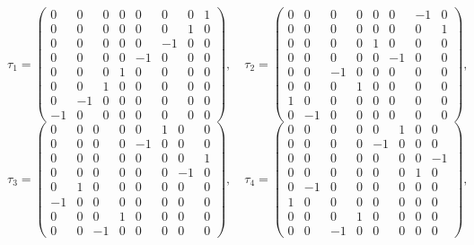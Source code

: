 \documentclass[10pt,a4paper]{article}
\begin{document}
\begin{equation*}
\tau_1=\begin{pmatrix}0 & 0 & 0 & 0 & 0 & 0 & 0 & 1 \\ 0 & 0 & 0 & 0 & 0 & 0 & 1 & 0 \\ 0 & 0 & 0 & 0 & 0 & -1 & 0 & 0 \\ 0 & 0 & 0 & 0 & -1 & 0 & 0 & 0 \\ 0 & 0 & 0 & 1 & 0 & 0 & 0 & 0 \\ 0 & 0 & 1 & 0 & 0 & 0 & 0 & 0 \\ 0 & -1 & 0 & 0 & 0 & 0 & 0 & 0 \\ -1 & 0 & 0 & 0 & 0 & 0 & 0 & 0\end{pmatrix},\quad \tau_2=\begin{pmatrix}0 & 0 & 0 & 0 & 0 & 0 & -1 & 0 \\ 0 & 0 & 0 & 0 & 0 & 0 & 0 & 1 \\ 0 & 0 & 0 & 0 & 1 & 0 & 0 & 0 \\ 0 & 0 & 0 & 0 & 0 & -1 & 0 & 0 \\ 0 & 0 & -1 & 0 & 0 & 0 & 0 & 0 \\ 0 & 0 & 0 & 1 & 0 & 0 & 0 & 0 \\ 1 & 0 & 0 & 0 & 0 & 0 & 0 & 0 \\ 0 & -1 & 0 & 0 & 0 & 0 & 0 & 0\end{pmatrix},
\end{equation*}
\begin{equation*}
\tau_3=\begin{pmatrix}0 & 0 & 0 & 0 & 0 & 1 & 0 & 0 \\ 0 & 0 & 0 & 0 & -1 & 0 & 0 & 0 \\ 0 & 0 & 0 & 0 & 0 & 0 & 0 & 1 \\ 0 & 0 & 0 & 0 & 0 & 0 & -1 & 0 \\ 0 & 1 & 0 & 0 & 0 & 0 & 0 & 0 \\ -1 & 0 & 0 & 0 & 0 & 0 & 0 & 0 \\ 0 & 0 & 0 & 1 & 0 & 0 & 0 & 0 \\ 0 & 0 & -1 & 0 & 0 & 0 & 0 & 0\end{pmatrix},\quad \tau_4=\begin{pmatrix}0 & 0 & 0 & 0 & 0 & 1 & 0 & 0 \\ 0 & 0 & 0 & 0 & -1 & 0 & 0 & 0 \\ 0 & 0 & 0 & 0 & 0 & 0 & 0 & -1 \\ 0 & 0 & 0 & 0 & 0 & 0 & 1 & 0 \\ 0 & -1 & 0 & 0 & 0 & 0 & 0 & 0 \\ 1 & 0 & 0 & 0 & 0 & 0 & 0 & 0 \\ 0 & 0 & 0 & 1 & 0 & 0 & 0 & 0 \\ 0 & 0 & -1 & 0 & 0 & 0 & 0 & 0\end{pmatrix},
\end{equation*}
\end{document}
